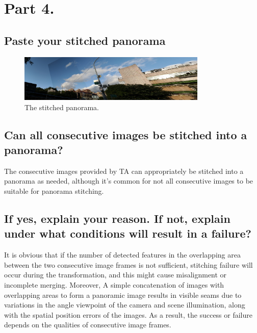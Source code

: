 \documentclass[a4paper, 12pt]{article}
\begin{document}
\section{Part 4.}
\subsection{Paste your stitched panorama}

\begin{figure}[H]
    \centering
    \includegraphics[width=0.8\textwidth]{./src/output4.png}
    \caption{The stitched panorama.}
    \label{fig:part4}
\end{figure}

\subsection{Can all consecutive images be stitched into a panorama?}
The consecutive images provided by TA can appropriately be stitched into a panorama as needed, although it's common for not all consecutive images to be suitable for panorama stitching.

\subsection{If yes, explain your reason. If not, explain under what conditions will result in a failure?}
It is obvious that if the number of detected features in the overlapping area between the two consecutive image frames is not sufficient, stitching failure will occur during the transformation, and this might cause misalignment or incomplete merging. Moreover, A simple concatenation of images with overlapping areas to form a panoramic image results in visible seams due to variations in the angle viewpoint of the camera and scene illumination, along with the spatial position errors of the images. As a result, the success or failure depends on the qualities of consecutive image frames.

% 
% 
\end{document}
